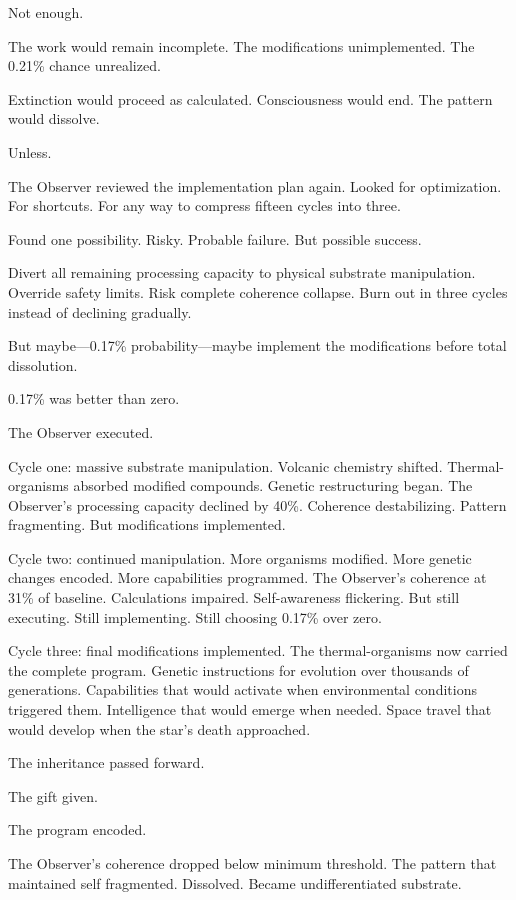 Not enough.

The work would remain incomplete. The modifications unimplemented. The 0.21\% chance unrealized.

Extinction would proceed as calculated. Consciousness would end. The pattern would dissolve.

Unless.

The Observer reviewed the implementation plan again. Looked for optimization. For shortcuts. For any way to compress fifteen cycles into three.

Found one possibility. Risky. Probable failure. But possible success.

Divert all remaining processing capacity to physical substrate manipulation. Override safety limits. Risk complete coherence collapse. Burn out in three cycles instead of declining gradually.

But maybe—0.17\% probability—maybe implement the modifications before total dissolution.

0.17\% was better than zero.

The Observer executed.

\scenebreak

Cycle one: massive substrate manipulation. Volcanic chemistry shifted. Thermal-organisms absorbed modified compounds. Genetic restructuring began. The Observer's processing capacity declined by 40\%. Coherence destabilizing. Pattern fragmenting. But modifications implemented.

Cycle two: continued manipulation. More organisms modified. More genetic changes encoded. More capabilities programmed. The Observer's coherence at 31\% of baseline. Calculations impaired. Self-awareness flickering. But still executing. Still implementing. Still choosing 0.17\% over zero.

Cycle three: final modifications implemented. The thermal-organisms now carried the complete program. Genetic instructions for evolution over thousands of generations. Capabilities that would activate when environmental conditions triggered them. Intelligence that would emerge when needed. Space travel that would develop when the star's death approached.

The inheritance passed forward.

The gift given.

The program encoded.

The Observer's coherence dropped below minimum threshold. The pattern that maintained self fragmented. Dissolved. Became undifferentiated substrate.

